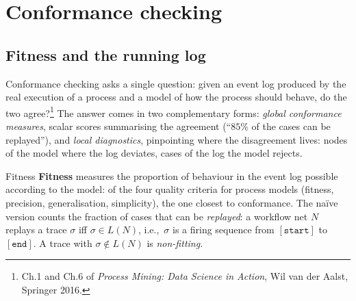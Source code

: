 \section{Conformance checking}

\subsection{Fitness and the running log}

Conformance checking asks a single question: given an event log produced by the real execution of a process and a model of how the process should behave, do the two agree?\footnote{Ch.1 and Ch.6 of \emph{Process Mining: Data Science in Action}, Wil van der Aalst, Springer 2016.} The answer comes in two complementary forms: \emph{global conformance measures}, scalar scores summarising the agreement (``$85\%$ of the cases can be replayed''), and \emph{local diagnostics}, pinpointing where the disagreement lives: nodes of the model where the log deviates, cases of the log the model rejects.
\begin{definitionbox}{Fitness}
\textbf{Fitness} measures the proportion of behaviour in the event log possible according to the model: of the four quality criteria for process models (fitness, precision, generalisation, simplicity), the one closest to conformance. The naïve version counts the fraction of cases that can be \emph{replayed}: a workflow net $N$ replays a trace $\sigma$ iff $\sigma \in L(N)$, i.e.,\ $\sigma$ is a firing sequence from $[\mathtt{start}]$ to $[\mathtt{end}]$. A trace with $\sigma \notin L(N)$ is \emph{non-fitting}.
\end{definitionbox}

